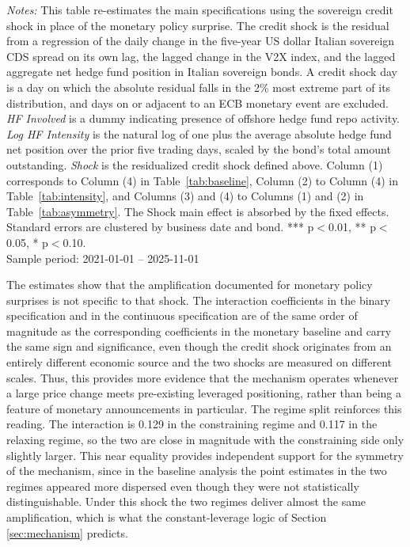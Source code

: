 \documentclass[english, 11pt, oneside]{article}
\begin{document}
\begin{table}[t]
\vspace{1ex}
\raggedright\scriptsize
\textit{Notes:} This table re-estimates the main specifications using the sovereign credit shock in place of the monetary policy surprise. The credit shock is the residual from a regression of the daily change in the five-year US dollar Italian sovereign CDS spread on its own lag, the lagged change in the V2X index, and the lagged aggregate net hedge fund position in Italian sovereign bonds. A credit shock day is a day on which the absolute residual falls in the 2\% most extreme part of its distribution, and days on or adjacent to an ECB monetary event are excluded. \textit{HF Involved} is a dummy indicating presence of offshore hedge fund repo activity. \textit{Log HF Intensity} is the natural log of one plus the average absolute hedge fund net position over the prior five trading days, scaled by the bond's total amount outstanding. \textit{Shock} is the residualized credit shock defined above. Column (1) corresponds to Column (4) in Table~\ref{tab:baseline}, Column (2) to Column (4) in Table~\ref{tab:intensity}, and Columns (3) and (4) to Columns (1) and (2) in Table~\ref{tab:asymmetry}. The Shock main effect is absorbed by the fixed effects. Standard errors are clustered by business date and bond. *** p$<$0.01, ** p$<$0.05, * p$<$0.10. \\ Sample period: 2021-01-01 -- 2025-11-01
\end{table}


The estimates show that the amplification documented for monetary policy surprises is not specific to that shock. The interaction coefficients in the binary specification and in the continuous specification are of the same order of magnitude as the corresponding coefficients in the monetary baseline and carry the same sign and significance, even though the credit shock originates from an entirely different economic source and the two shocks are measured on different scales. Thus, this provides more evidence that the mechanism operates whenever a large price change meets pre-existing leveraged positioning, rather than being a feature of monetary announcements in particular. The regime split reinforces this reading. The interaction is 0.129 in the constraining regime and 0.117 in the relaxing regime, so the two are close in magnitude with the constraining side only slightly larger. This near equality provides independent support for the symmetry of the mechanism, since in the baseline analysis the point estimates in the two regimes appeared more dispersed even though they were not statistically distinguishable. Under this shock the two regimes deliver almost the same amplification, which is what the constant-leverage logic of Section \ref{sec:mechanism} predicts.
\end{document}
